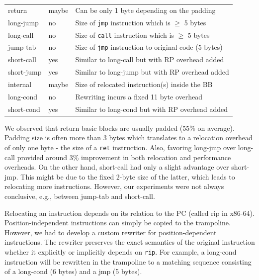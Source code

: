 {\begin{table}[t!]
\begin{tabularx}{\columnwidth}{@{}lll@{}}
        \textsf{return} & maybe & Can be only 1 byte depending on the padding \\
        \textsf{long-jump} & no & Size of \texttt{jmp} instruction which is $ \ge $ 5 bytes \\
        \textsf{long-call} & no & Size of \texttt{call} instruction which is $ \ge $ 5 bytes  \\
        \textsf{jump-tab} & no & Size of \texttt{jmp} instruction to original code (5 bytes)  \\
        \textsf{short-call} & yes & Similar to \textsf{long-call} but with RP overhead added \\
        \textsf{short-jump} & yes &Similar to \textsf{long-jump} but with RP overhead added\\
        \textsf{internal} & maybe & Size of relocated instruction(s) inside the BB \\
        \textsf{long-cond} & no & Rewriting incurs a fixed 11 byte overhead\\
        \textsf{short-cond} & yes & Similar to \textsf{long-cond} but with RP overhead added\\
        \bottomrule
    \end{tabularx}
\end{table}


%


We observed that \textsf{return} basic blocks are usually padded (55\% on average).
Padding size is often more than 3 bytes which translates to a relocation overhead of only one byte - the size of a  \texttt{ret} instruction.
Also, favoring \textsf{long-jmp} over \textsf{long-call} provided around 3\% improvement in both relocation and performance overheads.
On the other hand, \textsf{short-call} had only a slight advantage over \textsf{short-jmp}.
This might be due to the fixed 2-byte size of the latter, which leads to relocating more instructions.
However, our experiments were not always conclusive, e.g., between \textsf{jump-tab} and \textsf{short-call}.

Relocating an instruction depends on its relation to the PC (called \textsf{rip} in x86-64).
Position-independent instructions can simply be copied to the trampoline.
However, we had to develop a custom rewriter for position-dependent instructions.
The rewriter preserves the exact semantics of the original instruction whether it explicitly or implicitly depends on \texttt{rip}. 
For example, a \textsf{long-cond} instruction will be rewritten in the trampoline to a matching sequence consisting of a \textsf{long-cond} (6 bytes) and a \textsf{jmp} (5 bytes).

}
